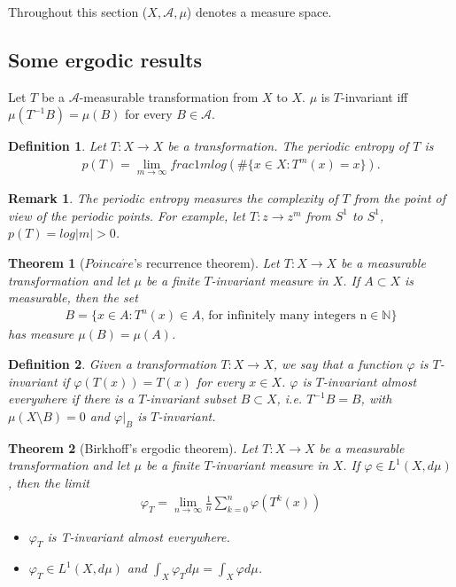 \documentclass[a4paper,10pt]{amsart}
\newtheorem{theorem}{Theorem}[section]
\newtheorem{definition}{Definition}[section]
\newtheorem{remark}{Remark}[section]
\newcommand{\A}{\mathcal{A}}
\newcommand{\N}{\mathbb N} %
\begin{document}
Throughout this section ($X, \A, \mu$) denotes a measure space.

\subsection{Some ergodic results}

Let $T$ be a $\A$-measurable transformation from $X$ to $X$.
$\mu$ is $T$-invariant iff $\mu(T^{-1}B) = \mu(B)$ for every $B \in \A$.

\begin{definition}
   Let $T : X  \rightarrow X$ be a transformation. The periodic entropy
   of $T$ is 
   \begin{align*}
       p(T) = \lim_{m \rightarrow \infty} frac{1}{m}
       log(\#\{x \in X : T^{m}(x)=x \}).
   \end{align*}
\end{definition}

\begin{remark}
   The periodic entropy measures the complexity of $T$ from the 
   point of view of the periodic points. For example, let 
   $T : z \rightarrow z^m$ from $S^1$ to $S^1$, 
   $p(T) = log|m| >0$.
\end{remark}

\begin{theorem}[$Poinca\acute{r}e$'s recurrence theorem]
   Let $T : X \rightarrow X$ be a measurable transformation and 
   let $\mu$ be a finite $T$-invariant measure in $X$. If $A \subset X$
   is measurable, then the set
   \begin{align*}
    B = \{ x \in A: T^n (x) \in A 
    \mbox{, for infinitely many integers n} \in \N \} 
   \end{align*}
   has measure $\mu(B) = \mu(A)$.
\end{theorem}

\begin{definition}
   Given a transformation $T: X \rightarrow X$, we say that 
   a function $\varphi$ is $T$-invariant if $\varphi(T(x)) = T(x)$ for 
   every $x \in X$. $\varphi$ is $T$-invariant almost everywhere
   if there is a $T$-invariant subset $B \subset X$, i.e. 
   $T^{-1}B = B$, with $\mu(X \setminus B) = 0$ and $\varphi|_{B}$ is
   $T$-invariant.
\end{definition}

\begin{theorem}[Birkhoff's ergodic theorem]
   Let $T : X \rightarrow X$ be a measurable transformation
   and let $\mu$ be a finite $T$-invariant measure in $X$. If
   $\varphi \in L^{1}(X, d\mu)$, then the limit
   \begin{align*}
       \varphi_{T} = \lim_{n \rightarrow \infty}\frac{1}{n}
       \sum_{k = 0}^{n} \varphi(T^k (x))
   \end{align*}
   \begin{itemize}
       \item $\varphi_{T}$ is T-invariant almost everywhere.
       \item $\varphi_{T} \in L^{1}(X, d\mu)$ and 
           $\int_{X}\varphi_{T} d\mu = \int_{X} \varphi d\mu$.
   \end{itemize}
\end{theorem}
\end{document}
